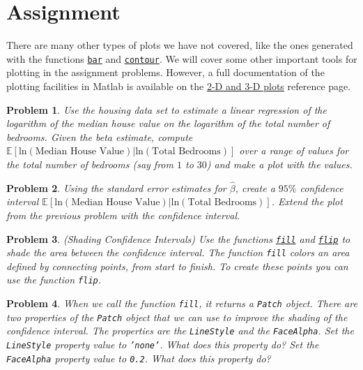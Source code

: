 \documentclass[12pt, a4paper]{article}
\newcommand{\E}[1]{\mathbb{E}{\left[#1\right]}}
\renewcommand{\ln}[1]{\text{ln}\left(#1\right)}
\newtheorem{problem}{Problem}
\begin{document}
\section{Assignment}
\label{sec:orgdecee32}
There are many other types of plots we have not covered, like the ones generated with the functions \href{https://www.mathworks.com/help/matlab/ref/bar.html?s\_tid=doc\_ta}{\texttt{bar}} and \href{https://www.mathworks.com/help/matlab/ref/contour.html?s\_tid=doc\_ta}{\texttt{contour}}.
We will cover some other important tools for plotting in the assignment problems.
However, a full documentation of the plotting facilities in Matlab is available on the \href{https://www.mathworks.com/help/matlab/2-and-3d-plots.html}{2-D and 3-D plots} reference page.

\begin{problem}
Use the housing data set to estimate a linear regression of the logarithm of the median house value on the logarithm of the total number of bedrooms.
Given the beta estimate, compute \(\E{\ln{\text{Median House Value}}\vert\ln{\text{Total Bedrooms}}}\) over a range of values for the total number of bedrooms (say from \(1\) to \(30\)) and make a plot with the values.
\end{problem}

\begin{problem}
Using the standard error estimates for \(\hat{\beta}\), create a \(95\%\) confidence interval \(\E{\ln{\text{Median House Value}}\vert\ln{\text{Total Bedrooms}}}\).
Extend the plot from the previous problem with the confidence interval.
\end{problem}

\begin{problem}
(Shading Confidence Intervals)
Use the functions \href{https://www.mathworks.com/help/matlab/ref/fill.html?s\_tid=doc\_ta}{\texttt{fill}} and \href{https://www.mathworks.com/help/matlab/ref/flip.html?s\_tid=doc\_ta}{\texttt{flip}} to shade the area between the confidence interval.
The function \texttt{fill} colors an area defined by connecting points, from start to finish.
To create these points you can use the function \texttt{flip}.
\end{problem}

\begin{problem}
When we call the function \texttt{fill}, it returns a \texttt{Patch} object.
There are two properties of the \texttt{Patch} object that we can use to improve the shading of the confidence interval.
The properties are the \texttt{LineStyle} and the \texttt{FaceAlpha}.
Set the \texttt{LineStyle} property value to \texttt{'none'}.
What does this property do?
Set the \texttt{FaceAlpha} property value to \texttt{0.2}.
What does this property do?
\end{problem}
\end{document}
